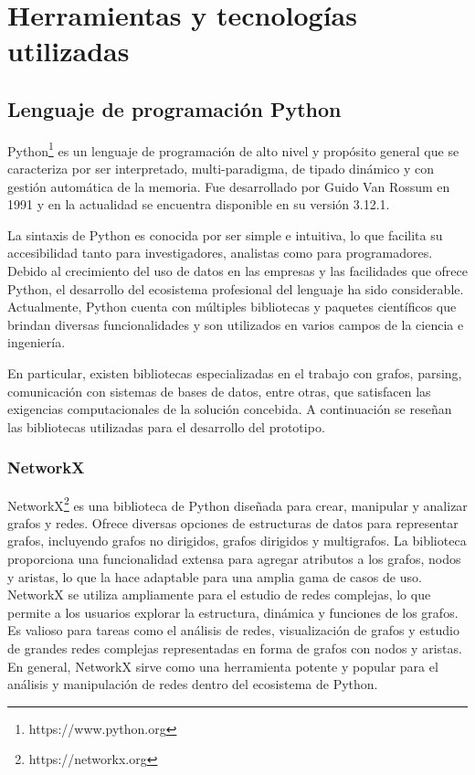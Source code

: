 \section{Herramientas y tecnologías utilizadas}\label{section:tools}

\subsection{Lenguaje de programación Python}

Python\footnote{https://www.python.org} es un lenguaje de programación de alto nivel y propósito general que se caracteriza por ser 
interpretado, multi-paradigma, de tipado dinámico y con gestión automática de la memoria. Fue desarrollado 
por Guido Van Rossum en 1991 y en la actualidad se encuentra disponible en su versión 3.12.1.

La sintaxis de Python es conocida por ser simple e intuitiva, lo que facilita su accesibilidad tanto para 
investigadores, analistas como para programadores. Debido al crecimiento del uso de datos en las empresas y 
las facilidades que ofrece Python, el desarrollo del ecosistema profesional del lenguaje ha sido considerable. 
Actualmente, Python cuenta con múltiples bibliotecas y paquetes científicos que brindan diversas funcionalidades 
y son utilizados en varios campos de la ciencia e ingeniería.

En particular, existen bibliotecas especializadas en el trabajo con grafos, parsing, comunicación 
con sistemas de bases de datos, entre otras, que satisfacen las exigencias computacionales de la 
solución concebida. A continuación se reseñan las bibliotecas utilizadas para el desarrollo del prototipo.

\subsubsection{NetworkX}

NetworkX\footnote{https://networkx.org} es una biblioteca de Python diseñada para crear, manipular y analizar 
grafos y redes. Ofrece diversas 
opciones de estructuras de datos para representar grafos, incluyendo grafos no dirigidos, grafos dirigidos y 
multigrafos. La biblioteca proporciona una funcionalidad extensa para agregar atributos a los grafos, nodos y 
aristas, lo que la hace adaptable para una amplia gama de casos de uso. NetworkX se utiliza ampliamente para 
el estudio de redes complejas, lo que permite a los usuarios explorar la estructura, dinámica y funciones de 
los grafos. Es valioso para tareas como el análisis de redes, visualización de grafos y estudio de grandes 
redes complejas representadas en forma de grafos con nodos y aristas. En general, NetworkX sirve como una 
herramienta potente y popular para el análisis y manipulación de redes dentro del ecosistema de Python.

